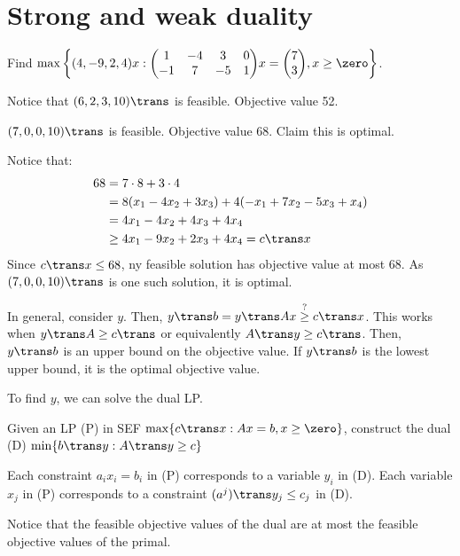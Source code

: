 \section{Strong and weak duality}

\begin{example}
  Find $\max\qty{(4,-9,2,4)x : \mqty(1&-4&3&0\\-1&7&-5&1)x = \mqty(7\\3), x \geq \zero}$.
\end{example}
\begin{sol}
  Notice that $(6,2,3,10)\trans$ is feasible. Objective value 52.

  $(7,0,0,10)\trans$ is feasible.
  Objective value 68. Claim this is optimal.

  Notice that:
  \begin{align*}
    68 & = 7\cdot8 + 3\cdot4                                  \\
       & = 8(x_1 - 4x_2 + 3x_3) + 4(-x_1 + 7x_2 - 5x_3 + x_4) \\
       & = 4x_1 - 4x_2 + 4x_3 + 4x_4                          \\
       & \geq 4x_1 - 9x_2 + 2x_3 + 4x_4 = c\trans x
  \end{align*}
  Since $c\trans x \leq 68$,
  ny feasible solution has objective value at most 68.
  As $(7,0,0,10)\trans$ is one such solution, it is optimal.
\end{sol}

In general, consider $y$. Then, $y\trans b = y\trans A x \stackrel{?}{\geq} c\trans x$.
This works when $y\trans A \geq c\trans$ or equivalently $A\trans y \geq c\trans$.
Then, $y\trans b$ is an upper bound on the objective value.
If $y\trans b$ is the lowest upper bound, it is the optimal objective value.

To find $y$, we can solve the dual LP.

\begin{defn}[dual LP]
  Given an LP (P) in SEF
  $\max\{c\trans x : Ax = b, x \geq \zero\}$, construct the dual (D)
  $\min\{b\trans y : A\trans y \geq c\}$
\end{defn}

Each constraint $a_i x_i = b_i$ in (P) corresponds to a variable $y_i$ in (D).
Each variable $x_j$ in (P) corresponds to a constraint $(a^j)\trans y_j \leq c_j$ in (D).


Notice that the feasible objective values of the dual are at most the
feasible objective values of the primal.


